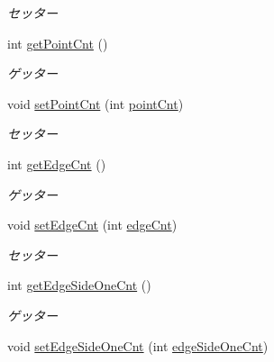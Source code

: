 \begin{DoxyCompactItemize}
\begin{DoxyCompactList}\small\item\em セッター \end{DoxyCompactList}\item 
int \hyperlink{classjp_1_1gr_1_1java__conf_1_1yuta__yoshinaga_1_1reversi_1_1model_1_1_reversi_anz_ad6a22ffbec6cd298d3943c437350e54c}{get\+Point\+Cnt} ()
\begin{DoxyCompactList}\small\item\em ゲッター \end{DoxyCompactList}\item 
void \hyperlink{classjp_1_1gr_1_1java__conf_1_1yuta__yoshinaga_1_1reversi_1_1model_1_1_reversi_anz_ad57c26b0d7851a3c9e1b1ad328f2f0be}{set\+Point\+Cnt} (int \hyperlink{classjp_1_1gr_1_1java__conf_1_1yuta__yoshinaga_1_1reversi_1_1model_1_1_reversi_anz_a0ac630cb512097389bcb044f01c2ae8a}{point\+Cnt})
\begin{DoxyCompactList}\small\item\em セッター \end{DoxyCompactList}\item 
int \hyperlink{classjp_1_1gr_1_1java__conf_1_1yuta__yoshinaga_1_1reversi_1_1model_1_1_reversi_anz_a5d51a4bf3440b83a671374a312873a23}{get\+Edge\+Cnt} ()
\begin{DoxyCompactList}\small\item\em ゲッター \end{DoxyCompactList}\item 
void \hyperlink{classjp_1_1gr_1_1java__conf_1_1yuta__yoshinaga_1_1reversi_1_1model_1_1_reversi_anz_aab3651918ed96bd47b03f79ff14f9bec}{set\+Edge\+Cnt} (int \hyperlink{classjp_1_1gr_1_1java__conf_1_1yuta__yoshinaga_1_1reversi_1_1model_1_1_reversi_anz_a903edaa9ecd6988e243b9af8af429bff}{edge\+Cnt})
\begin{DoxyCompactList}\small\item\em セッター \end{DoxyCompactList}\item 
int \hyperlink{classjp_1_1gr_1_1java__conf_1_1yuta__yoshinaga_1_1reversi_1_1model_1_1_reversi_anz_a075019ae93822dc76e9db367d357c501}{get\+Edge\+Side\+One\+Cnt} ()
\begin{DoxyCompactList}\small\item\em ゲッター \end{DoxyCompactList}\item 
void \hyperlink{classjp_1_1gr_1_1java__conf_1_1yuta__yoshinaga_1_1reversi_1_1model_1_1_reversi_anz_a126130b697a4306e782a539c8cea0a56}{set\+Edge\+Side\+One\+Cnt} (int \hyperlink{classjp_1_1gr_1_1java__conf_1_1yuta__yoshinaga_1_1reversi_1_1model_1_1_reversi_anz_a076ed8a5ff376c2d48fe7a01ac748dd6}{edge\+Side\+One\+Cnt})

\end{DoxyCompactItemize}
